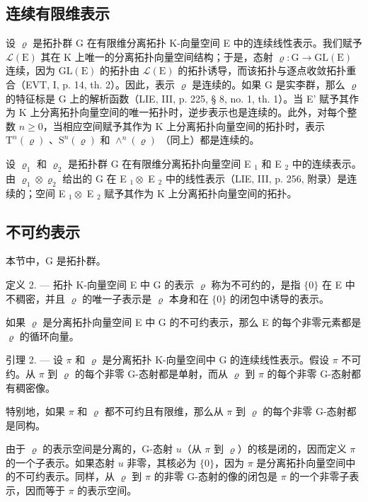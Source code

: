 \subsection{连续有限维表示}

设 \(\varrho\) 是拓扑群 G 在有限维分离拓扑 K-向量空间 E 中的连续线性表示。我们赋予 \(\mathcal{L}(\mathrm{E})\) 其在 K 上唯一的分离拓扑向量空间结构；于是，态射 \(\varrho\colon\mathrm{G}\to\mathrm{GL}(\mathrm{E})\) 连续，因为 \(\mathrm{GL}(\mathrm{E})\) 的拓扑由 \(\mathcal{L}(\mathrm{E})\) 的拓扑诱导，而该拓扑与逐点收敛拓扑重合（EVT, I, p. 14, th. 2）。因此，表示 \(\varrho\) 是连续的。如果 G 是实李群，那么 \(\varrho\) 的特征标是 G 上的解析函数（LIE, III, p. 225, § 8, no. 1, th. 1）。当 E' 赋予其作为 K 上分离拓扑向量空间的唯一拓扑时，逆步表示也是连续的。此外，对每个整数 \(n\geqslant0\)，当相应空间赋予其作为 K 上分离拓扑向量空间的拓扑时，表示 \(\mathrm{T}^{n}(\varrho)\) 、\(\mathrm{S}^{n}(\varrho)\) 和 \(\wedge^{n}(\varrho)\) （同上）都是连续的。

设 \(\varrho_{1}\) 和 \(\varrho_{2}\) 是拓扑群 G 在有限维分离拓扑向量空间 E \(_{1}\) 和 E \(_{2}\) 中的连续表示。由 \(\varrho_{1} \otimes \varrho_{2}\) 给出的 G 在 E \(_{1} \otimes\) E \(_{2}\) 中的线性表示（LIE, III, p. 256, 附录）是连续的；空间 E \(_{1} \otimes\) E \(_{2}\) 赋予其作为 K 上分离拓扑向量空间的拓扑。

\subsection{不可约表示}

本节中，G 是拓扑群。

定义 2. --- 拓扑 K-向量空间 E 中 G 的表示 \(\varrho\) 称为不可约的，是指 \(\{0\}\) 在 E 中不稠密，并且 \(\varrho\) 的唯一子表示是 \(\varrho\) 本身和在 \(\{0\}\) 的闭包中诱导的表示。

如果 \(\varrho\) 是分离拓扑向量空间 E 中 G 的不可约表示，那么 E 的每个非零元素都是 \(\varrho\) 的循环向量。

引理 2. --- 设 \(\pi\) 和 \(\varrho\) 是分离拓扑 K-向量空间中 G 的连续线性表示。假设 \(\pi\) 不可约。从 \(\pi\) 到 \(\varrho\) 的每个非零 G-态射都是单射，而从 \(\varrho\) 到 \(\pi\) 的每个非零 G-态射都有稠密像。

特别地，如果 \(\pi\) 和 \(\varrho\) 都不可约且有限维，那么从 \(\pi\) 到 \(\varrho\) 的每个非零 G-态射都是同构。

由于 \(\varrho\) 的表示空间是分离的，G-态射 \(u\)（从 \(\pi\) 到 \(\varrho\)）的核是闭的，因而定义 \(\pi\) 的一个子表示。如果态射 \(u\) 非零，其核必为 \(\{0\}\)，因为 \(\pi\) 是分离拓扑向量空间中的不可约表示。同样，从 \(\varrho\) 到 \(\pi\) 的非零 G-态射的像的闭包是 \(\pi\) 的一个非零子表示，因而等于 \(\pi\) 的表示空间。


